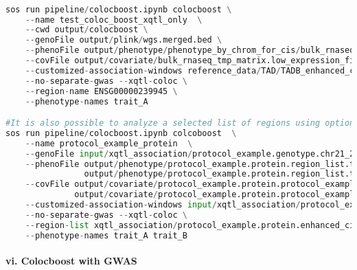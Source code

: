 \documentclass[12pt]{article}
\begin{document}
\noindent
\begin{lstlisting}[language=Python]

sos run pipeline/colocboost.ipynb colocboost \
    --name test_coloc_boost_xqtl_only  \
    --cwd output/colocboost \
    --genoFile output/plink/wgs.merged.bed \
    --phenoFile output/phenotype/phenotype_by_chrom_for_cis/bulk_rnaseq.phenotype_by_chrom_files.region_list.txt \
    --covFile output/covariate/bulk_rnaseq_tmp_matrix.low_expression_filtered.outlier_removed.tmm.expression.covariates.wgs.merged.plink_qc.plink_qc.prune.pca.Marchenko_PC.gz \
    --customized-association-windows reference_data/TAD/TADB_enhanced_cis.bed \
    --no-separate-gwas --xqtl-coloc \
    --region-name ENSG00000239945 \
    --phenotype-names trait_A

#It is also possible to analyze a selected list of regions using option `--region-list`. The last column of this file will be used for the list to analyze. Here for example use the same list of regions as we used for customized association-window:
sos run pipeline/colocboost.ipynb colcoboost  \
    --name protocol_example_protein  \
    --genoFile input/xqtl_association/protocol_example.genotype.chr21_22.bed   \
    --phenoFile output/phenotype/protocol_example.protein.region_list.txt \
                output/phenotype/protocol_example.protein.region_list.txt \
    --covFile output/covariate/protocol_example.protein.protocol_example.samples.protocol_example.genotype.chr21_22.pQTL.plink_qc.prune.pca.Marchenko_PC.gz \
              output/covariate/protocol_example.protein.protocol_example.samples.protocol_example.genotype.chr21_22.pQTL.plink_qc.prune.pca.Marchenko_PC.gz  \
    --customized-association-windows input/xqtl_association/protocol_example.protein.enhanced_cis_chr21_chr22.bed \
    --no-separate-gwas --xqtl-coloc \
    --region-list xqtl_association/protocol_example.protein.enhanced_cis_chr21_chr22.bed \
    --phenotype-names trait_A trait_B

\end{lstlisting}




\paragraph*{vi. Colocboost with GWAS}
\end{document}
